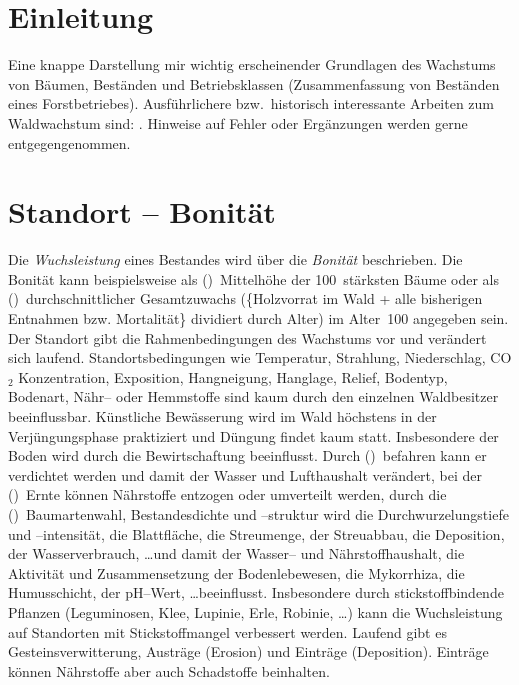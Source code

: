 \documentclass[twocolumn]{scrartcl}
\begin{document}
\tableofcontents

\section{Einleitung}

Eine knappe Darstellung mir wichtig erscheinender Grundlagen des Wachstums von
Bäumen, Beständen und Betriebsklassen (Zusammenfassung von Beständen eines
Forstbetriebes). Ausführlichere bzw.\ historisch interessante Arbeiten zum
Waldwachstum sind:
\cite{guttenberg1885Wachstumsgesetze,guttenberg1912ZuwachslehreInHandbuchDerForstwissenschaft,vanselow1941Zuwachslehre,weck1948,wiedemann1951Ertragskunde,assmann1961Waldertraskunde,erteld1966Waldertragslehre,mitscherlich1975WaldWachstumUmwelt,kramer1988Waldwachstumslehre,wenk1990Waldertragslehre,Gadow1999Modelling,Gadov2003Waldstruktur,pretzsch2002Grundlagen,Pretzsch2003Modellierung,Vanclay2006,Weiskittel2011,Pretzsch2019}.
Hinweise auf Fehler oder Ergänzungen werden gerne entgegengenommen.

\section{Standort -- Bonität}

Die \emph{Wuchsleistung} eines Bestandes wird über die \emph{Bonität}
beschrieben. Die Bonität kann beispielsweise als (\textbullet)~Mittelhöhe der
100~stärksten Bäume oder als (\textbullet)~durchschnittlicher Gesamtzuwachs
(\{Holzvorrat im Wald + alle bisherigen Entnahmen bzw. Mortalität\} dividiert
durch Alter) im Alter~100 angegeben sein. Der Standort gibt die
Rahmenbedingungen des Wachstums vor und verändert sich laufend.
Standortsbedingungen wie Temperatur, Strahlung, Niederschlag, CO$_2$
Konzentration, Exposition, Hangneigung, Hanglage, Relief, Bodentyp, Bodenart,
Nähr-- oder Hemmstoffe sind kaum durch den einzelnen Waldbesitzer beeinflussbar.
Künstliche Bewässerung wird im Wald höchstens in der Verjüngungsphase
praktiziert und Düngung findet kaum statt. Insbesondere der Boden wird durch die
Bewirtschaftung beeinflusst. Durch (\textbullet)~befahren kann er verdichtet
werden und damit der Wasser und Lufthaushalt verändert, bei der
(\textbullet)~Ernte können Nährstoffe entzogen oder umverteilt werden, durch die
(\textbullet)~Baumartenwahl, Bestandesdichte und --struktur wird die
Durchwurzelungstiefe und --intensität, die Blattfläche, die Streumenge, der
Streuabbau, die Deposition, der Wasserverbrauch, \dots und damit der Wasser--
und Nährstoffhaushalt, die Aktivität und Zusammensetzung der Bodenlebewesen, die
Mykorrhiza, die Humusschicht, der pH--Wert, \dots beeinflusst. Insbesondere
durch stickstoffbindende Pflanzen (Leguminosen, Klee, Lupinie, Erle, Robinie,
\dots) kann die Wuchsleistung auf Standorten mit Stickstoffmangel verbessert
werden. Laufend gibt es Gesteinsverwitterung, Austräge (Erosion) und Einträge
(Deposition). Einträge können Nährstoffe aber auch Schadstoffe beinhalten.
\end{document}
